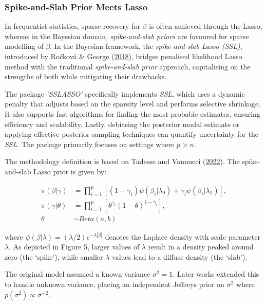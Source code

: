 \documentclass[
  11pt,
]{article}
\begin{document}
\subsubsection{Spike-and-Slab Prior Meets Lasso}

In frequentist statistics, sparse recovery for \(\beta\) is often
achieved through the Lasso, whereas in the Bayesian domain,
\emph{spike-and-slab priors} are favoured for sparse modelling of
\(\beta\). In the Bayesian framework, the \emph{spike-and-slab Lasso
(SSL)}, introduced by Ročková \& George
(\protect\hyperlink{ref-Rockova2018}{2018}), bridges penalised
likelihood Lasso method with the traditional \emph{spike-and-slab prior}
approach, capitalising on the strengths of both while mitigating their
drawbacks.

The package \emph{'SSLASSO'} specifically implements \emph{SSL}, which
uses a dynamic penalty that adjusts based on the sparsity level and
performs selective shrinkage. It also supports fast algorithms for
finding the most probable estimates, ensuring efficiency and
scalability. Lastly, debiasing the posterior modal estimate or applying
effective posterior sampling techniques can quantify uncertainty for the
\emph{SSL}. The package primarily focuses on settings where \(p > n\).

The methodology definition is based on Tadesse and Vannucci
(\protect\hyperlink{ref-Tadesse2022}{2022}). The spike-and-slab Lasso
prior is given by:

\begin{equation}
\begin{aligned}
\pi(\beta|\gamma) &= \prod_{i=1}^{p} [(1 - \gamma_i) \psi (\beta_i | \lambda_0) + \gamma_i \psi (\beta_i|\lambda_1)], \\
\pi(\gamma|\theta) &= \prod_{i=1}^{p} [\theta^{\gamma_i} (1-\theta)^{1-\gamma_i}], \\
\theta &\sim Beta(a, b)
\end{aligned}
\end{equation}

where \(\psi(\beta | \lambda) = (\lambda/2)e^{-\lambda|\beta|}\) denotes
the Laplace density with scale parameter \(\lambda\). As depicted in
Figure 5, larger values of \(\lambda\) result in a density peaked around
zero (the `spike'), while smaller \(\lambda\) values lead to a diffuse
density (the `slab').

The original model assumed a known variance \(\sigma^2 = 1\). Later
works extended this to handle unknown variance, placing an independent
Jeffreys prior on \(\sigma^2\) where
\(p(\sigma^2) \propto \sigma^{-2}\).
\end{document}
